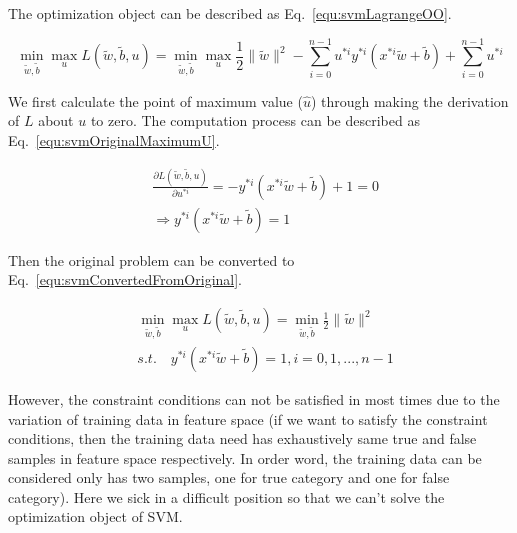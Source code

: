 \documentclass[runningheads,openany]{xhlPaper}
\begin{document}
The optimization object can be described as Eq.~\ref{equ:svmLagrangeOO}.

\begin{equation}
\label{equ:svmLagrangeOO}
\mathop {\min }\limits_{\tilde w,\tilde b} \mathop {\max }\limits_u L\left( {\tilde w,\tilde b,u} \right) = \mathop {\min }\limits_{\tilde w,\tilde b} \mathop {\max }\limits_u \frac{1}{2}\parallel \tilde w{\parallel ^2} - \sum\limits_{i = 0}^{n - 1} {{u^{*i}}{y^{*i}}\left( {{x^{*i}}\tilde w + \tilde b} \right)}  + \sum\limits_{i = 0}^{n - 1} {{u^{*i}}}
\end{equation}

We first calculate the point of maximum value (${\hat u}$) through making the derivation of $L$ about $u$ to zero. The computation process can be described as Eq.~\ref{equ:svmOriginalMaximumU}.

\begin{equation}
\label{equ:svmOriginalMaximumU}
\begin{aligned}
&\frac{{\partial L\left( {\tilde w,\tilde b,u} \right)}}{{\partial {u^{*i}}}} =  - {y^{*i}}\left( {{x^{*i}}\tilde w + \tilde b} \right) + 1 = 0\\
&\Rightarrow {y^{*i}}\left( {{x^{*i}}\tilde w + \tilde b} \right) = 1
\end{aligned}
\end{equation}

Then the original problem can be converted to Eq.~\ref{equ:svmConvertedFromOriginal}.

\begin{equation}
\label{equ:svmConvertedFromOriginal}
\begin{aligned}
&\mathop {\min }\limits_{\tilde w,\tilde b} \mathop {\max }\limits_u L\left( {\tilde w,\tilde b,u} \right) = \mathop {\min }\limits_{\tilde w,\tilde b} \frac{1}{2}\parallel \tilde w{\parallel ^2}\\
&s.t.\quad {y^{*i}}\left( {{x^{*i}}\tilde w + \tilde b} \right) = 1,i = 0,1,...,n - 1
\end{aligned}
\end{equation} 

However, the constraint conditions can not be satisfied in most times due to the variation of training data in feature space (if we want to satisfy the constraint conditions, then the training data need has exhaustively same true and false samples in feature space respectively. In order word, the training data can be considered only has two samples, one for true category and one for false category). Here we sick in a difficult position so that we can't solve the optimization object of SVM.
\end{document}

